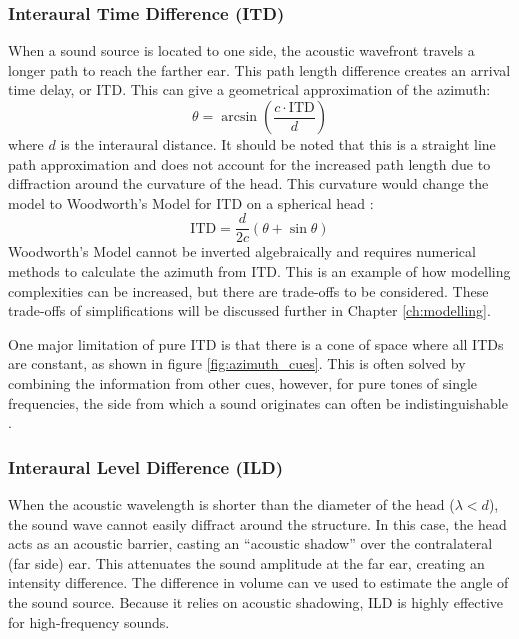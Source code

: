  \subsubsection{Interaural Time Difference (ITD)} When a sound source is located to one side, the acoustic wavefront travels a longer path to reach the farther ear. This path length difference creates an arrival time delay, or ITD. This can give a geometrical approximation of the azimuth:
\begin{equation}
    \theta = \arcsin\left(\frac{c \cdot \text{ITD}}{d}\right)
    \label{eq:itd_azimuth}
\end{equation}
where $d$ is the interaural distance. It should be noted that this is a straight line path approximation and does not account for the increased path length due to diffraction around the curvature of the head. This curvature would change the model to Woodworth's Model for ITD on a spherical head \cite{ExperimentalArchive}:
\begin{equation}
    \text{ITD} = \frac{d}{2c}(\theta + \sin\theta)
\end{equation}
Woodworth's Model cannot be inverted algebraically and requires numerical methods to calculate the azimuth from ITD. This is an example of how modelling complexities can be increased, but there are trade-offs to be considered. These trade-offs of simplifications will be discussed further in Chapter \ref{ch:modelling}.

One major limitation of pure ITD is that there is a cone of space where all ITDs are constant, as shown in figure \ref{fig:azimuth_cues}. This is often solved by combining the information from other cues, however, for pure tones of single frequencies, the side from which a sound originates can often be indistinguishable \cite{Rayleigh1907Direction}.

\subsubsection{Interaural Level Difference (ILD)} 
When the acoustic wavelength is shorter than the diameter of the head ($\lambda < d$), the sound wave cannot easily diffract around the structure. In this case, the head acts as an acoustic barrier, casting an ``acoustic shadow'' over the contralateral (far side) ear. This attenuates the sound amplitude at the far ear, creating an intensity difference. The difference in volume can ve used to estimate the angle of the sound source. Because it relies on acoustic shadowing, ILD is highly effective for high-frequency sounds. 


